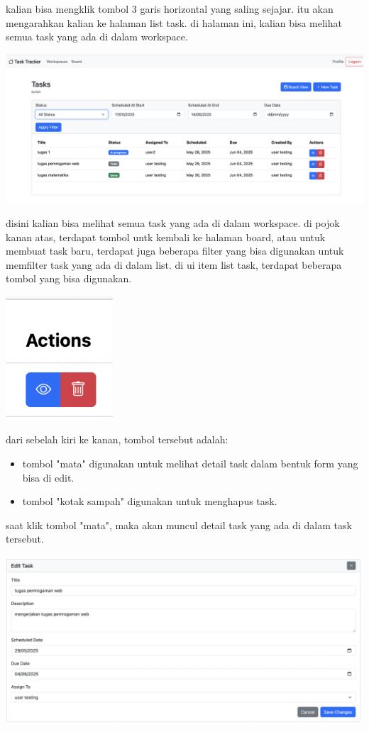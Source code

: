kalian bisa mengklik tombol 3 garis horizontal yang saling sejajar.
itu akan mengarahkan kalian ke halaman list task. di halaman ini, kalian bisa melihat semua task yang ada di dalam workspace.
\begin{center}
  \includegraphics[width=1\textwidth]{assets/ui/list_task.png}
\end{center}
disini kalian bisa melihat semua task yang ada di dalam workspace.
di pojok kanan atas, terdapat tombol untk kembali ke halaman board, atau untuk membuat task baru,
terdapat juga beberapa filter yang bisa digunakan untuk memfilter task yang ada di dalam list. 
di ui item list task, terdapat beberapa tombol yang bisa digunakan.
\begin{center}
  \includegraphics[width=0.3\textwidth]{assets/ui/list_task_action_buttons.png}
\end{center}
dari sebelah kiri ke kanan, tombol tersebut adalah:
\begin{itemize}
  \item tombol "mata" digunakan untuk melihat detail task dalam bentuk form yang bisa di edit.
  \item tombol "kotak sampah" digunakan untuk menghapus task.
\end{itemize}
saat klik tombol "mata", maka akan muncul detail task yang ada di dalam task tersebut.
\begin{center}
  \includegraphics[width=1\textwidth]{assets/ui/list_task_edit.png}
\end{center}
